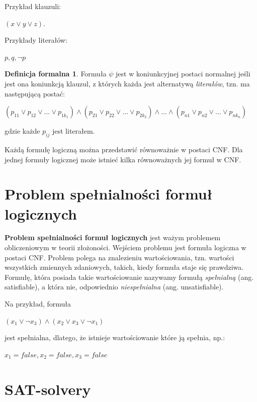 \documentclass[a4paper,12pt,oneside]{book}
\theoremstyle{definition}
\newtheorem*{formal}{Definicja formalna}
\begin{document}
Przykład klauzuli:

\begin{center}
    $(x \lor y \lor z)$. 
\end{center}

Przykłady literałów:

\begin{center}
    $p, q, \neg p$
\end{center}

\begin{formal}
    Formuła $\psi$ jest w koniunkcyjnej postaci normalnej jeśli jest ona koniunkcją klauzul, z których każda jest alternatywą \textit{literałów}, tzn. ma następującą postać: 
    \begin{center}
    $(p_{11} \lor p_{12} \lor \ldots \lor p_{1{k_1}}) \land (p_{21} \lor p_{22} \lor \ldots \lor p_{2{k_2}}) \land \ldots \land (p_{n1} \lor p_{n2} \lor \ldots \lor p_{n{k_n}})$
    \end{center}
    gdzie każde $p_{ij}$ jest literałem.
\end{formal}

Każdą formułę logiczną można przedstawić równoważnie w postaci CNF. Dla jednej formuły logicznej może istnieć kilka równoważnych jej formuł w CNF.  

\section{Problem spełnialności formuł logicznych}

\textbf{Problem spełnialności formuł logicznych} jest ważym problemem obliczeniowym w teorii złożoności. Wejściem problemu jest formuła logiczna w postaci CNF. Problem polega na znalezieniu wartościowania, tzn. wartości wszystkich zmiennych zdaniowych, takich, kiedy formuła staje się prawdziwa. Formułę, która posiada takie wartościowanie nazywamy formułą \textit{spełnialną} (ang. satisfiable), a która nie, odpowiednio \textit{niespełnialna} (ang. unsatisfiable).

Na przykład, formuła
\begin{center}
    $(x_1 \lor \neg x_3) \land (x_2 \lor x_3 \lor \neg x_1)$
\end{center}

jest spełnialna, dlatego, że istnieje wartościowanie które ją spełnia, np.:
\begin{center}
    $x_1 = false, x_2 = false, x_3 = false$
\end{center}

\section{SAT-solvery}
\end{document}
